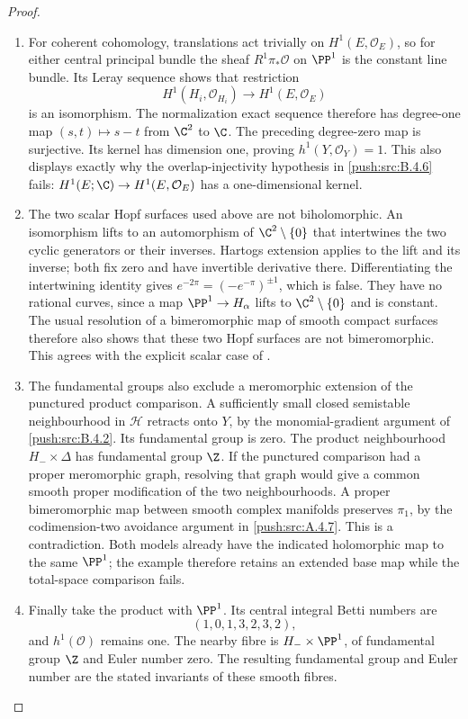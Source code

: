 \begin{proof}
\begin{enumerate}[label=\arabic*.,leftmargin=*]
\item For coherent cohomology, translations act trivially on
$H^1(E,\mathcal O_E)$, so for either central principal bundle
the sheaf $R^1\pi_*\mathcal O$ on $\PP^1$ is the constant
line bundle.  Its Leray sequence shows that restriction
\[
 H^1(H_i,\mathcal O_{H_i})\longrightarrow H^1(E,\mathcal O_E)
\]
is an isomorphism.  The normalization exact sequence therefore
has degree-one map $(s,t)\mapsto s-t$ from $\C^2$ to $\C$.
The preceding degree-zero map is surjective.  Its kernel has
dimension one, proving $h^1(Y,\mathcal O_Y)=1$.
This also displays exactly why the overlap-injectivity hypothesis
in \ref{push:src:B.4.6} fails: $H^1(E;\C)\to H^1(E,\mathcal O_E)$ has a
one-dimensional kernel.

\item The two scalar Hopf surfaces used above are
not biholomorphic.  An isomorphism lifts to an automorphism of
$\C^2\setminus\{0\}$ that intertwines the two cyclic generators
or their inverses.  Hartogs extension applies to the lift and
its inverse; both fix zero and have invertible derivative there.
Differentiating the intertwining identity gives
$e^{-2\pi}=(-e^{-\pi})^{\pm1}$, which is false.  They have
no rational curves, since a map $\PP^1\to H_\alpha$ lifts to
$\C^2\setminus\{0\}$ and is constant.  The usual resolution
of a bimeromorphic map of smooth compact surfaces therefore
also shows that these two Hopf surfaces are not bimeromorphic.
This agrees with the explicit scalar case of
\citet[arXiv version~1, Section~2.2, pp.~4--5]{AbashevaDeev2024AB}.

\item The fundamental groups also exclude a meromorphic
extension of the punctured product comparison. A sufficiently
small closed semistable neighbourhood in $\mathcal H$ retracts
onto $Y$, by the monomial-gradient argument of \ref{push:src:B.4.2}.  Its
fundamental group is zero.  The product neighbourhood
$H_-\times\Delta$ has fundamental group $\Z$.  If the
punctured comparison had a proper meromorphic graph, resolving
that graph would give a common smooth proper modification of
the two neighbourhoods.  A proper bimeromorphic map between
smooth complex manifolds preserves $\pi_1$, by the
codimension-two avoidance argument in \ref{push:src:A.4.7}.  This is a
contradiction.  Both models already have the indicated
holomorphic map to the same $\PP^1$; the example therefore
retains an extended base map while the total-space comparison
fails.

\item Finally take the product with $\PP^1$.  Its central integral
Betti numbers are
\[
 (1,0,1,3,2,3,2),
\]
and $h^1(\mathcal O)$ remains one.  The nearby fibre is
$H_-\times\PP^1$, of fundamental group $\Z$ and Euler
number zero.  The resulting fundamental group and Euler number are the stated
invariants of these smooth fibres.
\end{enumerate}
\end{proof}